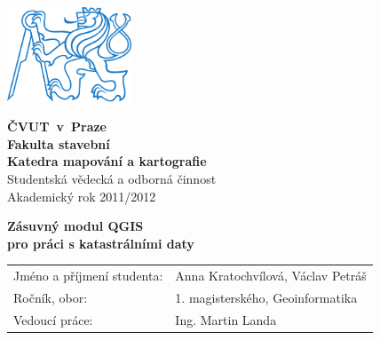 \pagestyle{empty}
{
\newcommand{\napisCVUT}{ČVUT~v~Praze}
\newcommand{\napisFS}{Fakulta stavební}
\newcommand{\napisSVOC}{Studentská vědecká a odborná činnost}
\newcommand{\napisAK}{Akademický rok  2011/2012}
\newcommand{\napisObor}{Geoinformatika}
\newcommand{\napisKatedra}{Katedra mapování a kartografie}
\newcommand{\napisVedouci}{Ing. Martin Landa}
\newcommand{\napisAutor}{Anna Kratochvílová, Václav Petráš}
\newcommand{\napisRocnik}{1. magisterského}
\newcommand{\napisNazevI}{Zásuvný modul QGIS}
\newcommand{\napisNazevII}{pro práci s katastrálními daty}


\begin{minipage}{0.2\textwidth}
\includegraphics[width=3.7cm]{logo_cvut_modre}
\end{minipage}
\hfill
\begin{minipage}{0.7\textwidth}
\begin{flushright}
\textsf{
\textbf{
\Large
\napisCVUT\\
\napisFS\\
\napisKatedra\\
}
\Large
\napisSVOC\\
\napisAK
}
\end{flushright}
\end{minipage}


\begin{center}
\vfill
\textsf{
\textbf{
\Huge
\napisNazevI\\
\napisNazevII\\
}}
\vfill
\end{center}

\newcommand{\rtu}[2]{\textsf{#1}&\textsf{#2}\\}
\begin{tabular}{ll}
\rtu{Jméno a příjmení studenta:}{\napisAutor}
\rtu{Ročník, obor:}{\napisRocnik, \napisObor}
\rtu{Vedoucí práce:}{\napisVedouci}
\end{tabular}
}
